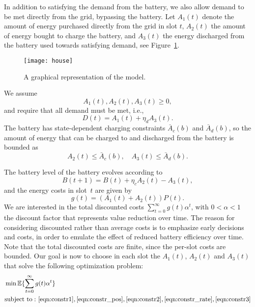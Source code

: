 \documentclass[journal]{IEEEtran}
\newcommand{\Amax}{\bar{A}}
\newcommand\1{\mathbf{1}}
\newcommand{\expect}[1]{{\mathbb E}\{#1\}}
\begin{document}
In addition to satisfying the demand from the battery, we also allow demand to be met directly from the grid, bypassing the battery. Let $A_1(t)$ denote the amount of energy purchased directly from the grid in slot $t$, $A_2(t)$ the amount of energy bought to charge the battery, and $A_3(t)$ the energy discharged from the battery used towards satisfying demand, see Figure~\ref{fig:house}.

\begin{figure}[h]
    \begin{center}
        \texttt{[image: house]}
    \end{center}
    \caption{A graphical representation of the model.}
    \label{fig:house}
\end{figure}

We assume
\begin{equation}\label{eqn:constr_pos}
A_1(t), A_2(t), A_3(t) \ge 0,
\end{equation}
and require that all demand must be met, i.e.,
\begin{equation}\label{eqn:constr2}
D(t) = A_1(t) + \eta_d A_3(t).
\end{equation}
The battery has state-dependent charging constraints $\Amax_c(b)$ and $\Amax_d(b)$, so the amount of energy that can be charged to and discharged from the battery is bounded as
\begin{equation}\label{eqn:constr_rate}
A_2(t) \le \Amax_c(b), \quad A_3(t) \le \Amax_d(b).
\end{equation}


The battery level of the battery evolves according to
\begin{equation}\label{eqn:constr3}
B(t+1) = B(t) + \eta_c A_2(t) - A_3(t),
\end{equation}
and the energy costs in slot~$t$ are given by
\begin{equation}\label{eqn:energy_costs}
g(t) = (A_1(t) + A_2(t)) P(t).
\end{equation}
We are interested in the total discounted costs $\sum_{t = 0}^\infty g(t) \alpha^t$, with $0 < \alpha < 1$ the discount factor that represents value reduction over time. The reason for considering discounted rather than average costs is to emphasize early decisions and costs, in order to emulate the effect of reduced battery efficiency over time. Note that the total discounted costs are finite, since the per-slot costs are bounded. Our goal is now to choose in each slot the $A_1(t)$, $A_2(t)$ and $A_3(t)$ that solve the following optimization problem:
\begin{align}
\nonumber &\min \expect{\sum_{t = 0}^\infty g(t) \alpha^t}\\
&{\rm subject~to:}~\eqref{eqn:constr1},\eqref{eqn:constr_pos},\eqref{eqn:constr2},\eqref{eqn:constr_rate},\eqref{eqn:constr3} \label{eqn:min_problem}
\end{align}
\end{document}
